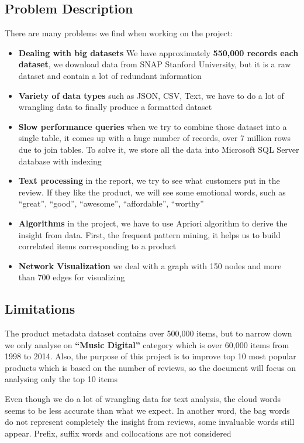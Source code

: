 \documentclass[a4paper,11pt]{article}
\begin{document}
	\subsection{Problem Description}
		There are many problems we find when working on the project:
		\begin{itemize}
			\item \textbf{Dealing with big datasets} We have approximately \textbf{550,000 records each dataset}, we download data from SNAP Stanford University, but it is a raw dataset and contain a lot of redundant information
			\item \textbf{Variety of data types} such as JSON, CSV, Text, we have to do a lot of wrangling data to finally produce a formatted dataset
			\item \textbf{Slow performance queries} when we try to combine those dataset into a single table, it comes up with a huge number of records, over 7 million rows due to join tables. To solve it, we store all the data into Microsoft SQL Server database with indexing
			\item \textbf{Text processing} in the report, we try to see what customers put in the review. If they like the product, we will see some emotional words, such as “great”, “good”, “awesome”, “affordable”, “worthy”
			\item \textbf{Algorithms} in the project, we have to use Apriori algorithm to derive the insight from data. First, the frequent pattern mining, it helps us to build correlated items corresponding to a product
			\item \textbf{Network Visualization} we deal with a graph with 150 nodes and more than 700 edges for visualizing
		\end{itemize}
	
	\subsection{Limitations}
		The product metadata dataset contains over 500,000 items, but to narrow down we only analyse on \textbf{“Music Digital”} category which is over 60,000 items from 1998 to 2014. Also, the purpose of this project is to improve top 10 most popular products which is based on the number of reviews, so the document will focus on analysing only the top 10 items
		
		Even though we do a lot of wrangling data for text analysis, the cloud words seems to be less accurate than what we expect. In another word, the bag words do not represent completely the insight from reviews, some invaluable words still appear. Prefix, suffix words and collocations are not considered
\end{document}
